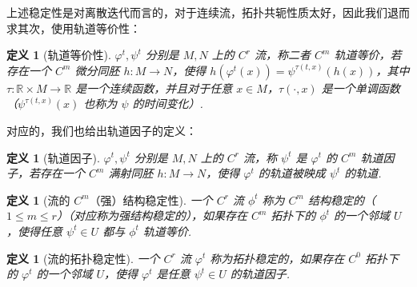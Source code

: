 \documentclass[11pt, a4paper, oneside]{ctexart}
\newtheorem{definition}[theorem]{定义}
\newcommand{\R}{\mathbb{R}}
\begin{document}
    上述稳定性是对离散迭代而言的，对于连续流，拓扑共轭性质太好，因此我们退而求其次，使用轨道等价性：
    \begin{definition}[轨道等价性]
        $\varphi^t,\psi^t$ 分别是 $M,N$ 上的 $C^r$ 流，称二者 $C^m$ 轨道等价，若存在一个 $C^m$ 微分同胚 $h:M\to N$，使得 $h(\varphi^t(x))=\psi^{\tau(t,x)}(h(x))$，其中 $\tau:\R\times M\to\R$ 是一个连续函数，并且对于任意 $x\in M$，$\tau(\cdot,x)$ 是一个单调函数（$\psi^{\tau(t,x)}(x)$ 也称为 $\psi$ 的时间变化）.
    \end{definition}
    对应的，我们也给出轨道因子的定义：
    \begin{definition}[轨道因子]
        $\varphi^t,\psi^t$ 分别是 $M,N$ 上的 $C^r$ 流，称 $\psi^t$ 是 $\varphi^t$ 的 $C^m$ 轨道因子，若存在一个 $C^m$ 满射同胚 $h:M\to N$，使得 $\varphi^t$ 的轨道被映成 $\psi^t$ 的轨道.
    \end{definition}

    \begin{definition}[流的 $C^m$（强）结构稳定性]
        一个 $C^r$ 流 $\phi^t$ 称为 $C^m$ 结构稳定的（$1\leq m\leq r$）（对应称为强结构稳定的），如果存在 $C^m$ 拓扑下的 $\phi^t$ 的一个邻域 $U$，使得任意 $\psi^t\in U$ 都与 $\phi^t$ 轨道等价.
    \end{definition}
    \begin{definition}[流的拓扑稳定性]
        一个 $C^r$ 流 $\varphi^t$ 称为拓扑稳定的，如果存在 $C^0$ 拓扑下的 $\varphi^t$ 的一个邻域 $U$，使得 $\varphi^t$ 是任意 $\psi^t\in U$ 的轨道因子.
    \end{definition}
\end{document}
